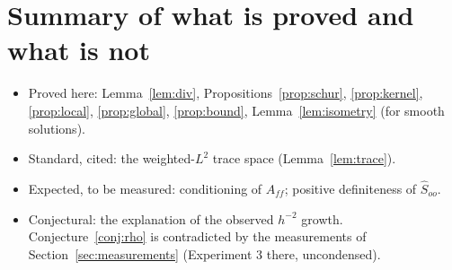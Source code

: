 \documentclass[11pt]{article}
\theoremstyle{remark}
\theoremstyle{definition}
\newcommand{\Shat}{\widehat{S}}
\begin{document}
\section*{Summary of what is proved and what is not}
\begin{itemize}[nosep]
  \item Proved here: Lemma~\ref{lem:div}, Propositions~\ref{prop:schur}, \ref{prop:kernel}, \ref{prop:local},
        \ref{prop:global}, \ref{prop:bound}, Lemma~\ref{lem:isometry} (for smooth solutions).
  \item Standard, cited: the weighted-$L^2$ trace space (Lemma~\ref{lem:trace}).
  \item Expected, to be measured: conditioning of $A_{ff}$; positive definiteness of $\Shat_{oo}$.
  \item Conjectural: the explanation of the observed $h^{-2}$ growth.  Conjecture~\ref{conj:rho} is contradicted by the
        measurements of Section~\ref{sec:measurements} (Experiment 3 there, uncondensed).
\end{itemize}
\end{document}
